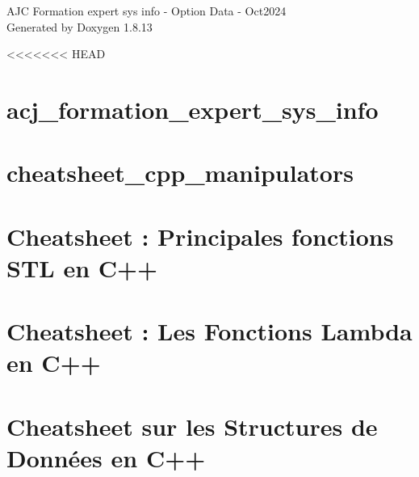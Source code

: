 \documentclass[twoside]{book}
\newcommand{\+}{\discretionary{\mbox{\scriptsize$\hookleftarrow$}}{}{}}
\newcommand{\clearemptydoublepage}{%
  \newpage{\pagestyle{empty}\cleardoublepage}%
}
\begin{document}
\hypersetup{pageanchor=false,
             bookmarksnumbered=true,
             pdfencoding=unicode
            }
\begin{titlepage}
\vspace*{7cm}
\begin{center}%
{\Large A\+JC Formation expert sys info -\/ Option Data -\/ Oct2024 }\\
\vspace*{1cm}
{\large Generated by Doxygen 1.8.13}\\
\end{center}
\end{titlepage}
\clearemptydoublepage
{}
\tableofcontents
\clearemptydoublepage
{}
\hypersetup{pageanchor=true}

<<<<<<< HEAD
\chapter{acj\+\_\+formation\+\_\+expert\+\_\+sys\+\_\+info}
\label{md_README}
\chapter{cheatsheet\+\_\+cpp\+\_\+manipulators}
\label{md_base_connaissances_Cpp_cheatsheet_cheatsheet_cpp_manipulators}

\chapter{Cheatsheet \+: Principales fonctions S\+TL en C++}
\label{md_base_connaissances_Cpp_cheatsheet_cheatsheet_fonctions_stl_cpp}

\chapter{Cheatsheet \+: Les Fonctions Lambda en C++}
\label{md_base_connaissances_Cpp_cheatsheet_cheatsheet_lambdas_cpp}

\chapter{Cheatsheet sur les Structures de Données en C++}
\label{md_base_connaissances_Cpp_cheatsheet_cheatsheet_structures_donnees_cpp}

\end{document}
